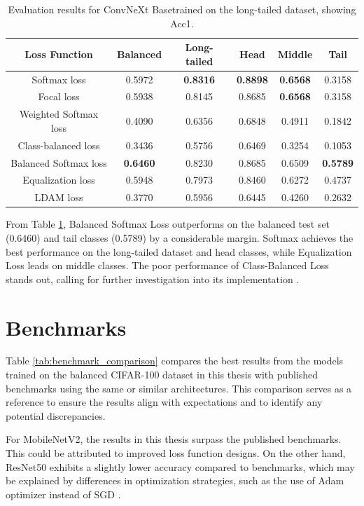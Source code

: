 \begin{table}[h!]
    \centering
    \caption{Evaluation results for ConvNeXt Basetrained on the long-tailed dataset, showing Acc1.}
    \begin{tabular}{cccccc}
        \toprule
        Loss Function & Balanced & Long-tailed & Head & Middle & Tail \\ 
        \midrule
        Softmax loss   & 0.5972 & \textbf{0.8316} & \textbf{0.8898} & \textbf{0.6568} & 0.3158 \\
        Focal loss   & 0.5938 & 0.8145 & 0.8685 & \textbf{0.6568} & 0.3158 \\
        Weighted Softmax loss   & 0.4090 & 0.6356 & 0.6848 & 0.4911 & 0.1842 \\
        Class-balanced loss   & 0.3436 & 0.5756 & 0.6469 & 0.3254 & 0.1053 \\
        Balanced Softmax loss   & \textbf{0.6460} & 0.8230 & 0.8685 & 0.6509 & \textbf{0.5789} \\
        Equalization loss   & 0.5948 & 0.7973 & 0.8460 & 0.6272 & 0.4737 \\
        LDAM loss   & 0.3770 & 0.5956 & 0.6445 & 0.4260 & 0.2632 \\
        \bottomrule
    \end{tabular}
    \label{tab:conv_lt_acc1_1}
\end{table}

From Table \ref{tab:conv_lt_acc1_1}, Balanced Softmax Loss outperforms on the balanced test set (0.6460) and tail classes (0.5789) by a considerable margin. Softmax achieves the best performance on the long-tailed dataset and head classes, while Equalization Loss leads on middle classes. The poor performance of Class-Balanced Loss stands out, calling for further investigation into its implementation . 

\section{Benchmarks}
Table \ref{tab:benchmark_comparison} compares the best results from the models trained on the balanced CIFAR-100 dataset in this thesis with published benchmarks using the same or similar architectures. This comparison serves as a reference to ensure the results align with expectations and to identify any potential discrepancies. 

For MobileNetV2, the results in this thesis surpass the published benchmarks. This could be attributed to improved loss function designs. On the other hand, ResNet50 exhibits a slightly lower accuracy compared to benchmarks, which may be explained by differences in optimization strategies, such as the use of Adam optimizer instead of SGD \cite{menon2021longtaillearninglogitadjustment}.

